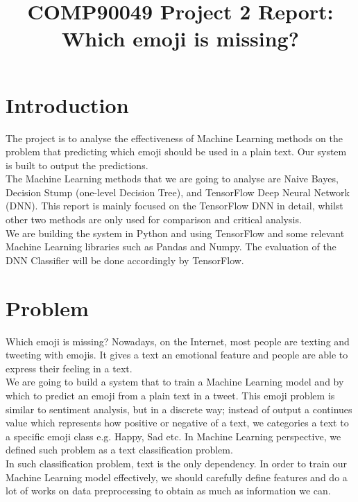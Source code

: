 \documentclass[12pt]{article}
\title{COMP90049 Project 2 Report: Which emoji is missing?}
\begin{document}
\maketitle

\section{Introduction}

The project is to analyse the effectiveness of Machine Learning methods on the problem that predicting which emoji should be used in a plain text. Our system is built to output the predictions.
\medskip \\
The Machine Learning methods that we are going to analyse are Naive Bayes, Decision Stump (one-level Decision Tree), and TensorFlow Deep Neural Network (DNN). This report is mainly focused on the TensorFlow DNN in detail, whilst other two methods are only used for comparison and critical analysis.
\medskip \\
We are building the system in Python and using TensorFlow and some relevant Machine Learning libraries such as Pandas and Numpy. The evaluation of the DNN Classifier will be done accordingly by TensorFlow.

\section{Problem}

Which emoji is missing? Nowadays, on the Internet, most people are texting and tweeting with emojis. It gives a text an emotional feature and people are able to express their feeling in a text.
\medskip \\
We are going to build a system that to train a Machine Learning model and by which to predict an emoji from a plain text in a tweet. This emoji problem is similar to sentiment analysis, but in a discrete way; instead of output a continues value which represents how positive or negative of a text, we categories a text to a specific emoji class e.g. Happy, Sad etc. In Machine Learning perspective, we defined such problem as a text classification problem.
\medskip \\
In such classification problem, text is the only dependency. In order to train our Machine Learning model effectively, we should carefully define features and do a lot of works on data preprocessing to obtain as much as information we can. 
\end{document}
